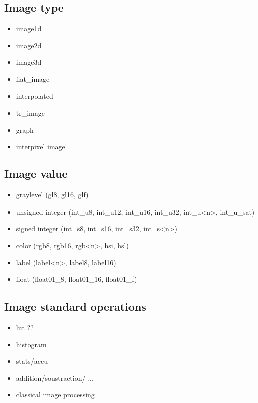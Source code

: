 \documentclass{article}
\begin{document}
\subsection{Image type}

\begin{itemize}
 \item image1d
 \item image2d
 \item image3d
 \item flat\_image
 \item interpolated
 \item tr\_image
 \item graph
 \item interpixel image
\end{itemize}

\subsection{Image value}

\begin{itemize}
 \item graylevel (gl8, gl16, glf)
 \item unsigned integer (int\_u8, int\_u12, int\_u16, int\_u32, int\_u<n>, int\_u\_sat)
 \item signed integer (int\_s8, int\_s16, int\_s32, int\_s<n>)
 \item color (rgb8, rgb16, rgb<n>, hsi, hsl)
 \item label (label<n>, label8, label16)
 \item float (float01\_8, float01\_16, float01\_f)
\end{itemize}



\subsection{Image standard operations}

\begin{itemize}
 \item lut ??
 \item histogram
 \item stats/accu
 \item addition/soustraction/ ...
 \item classical image processing
\end{itemize}
\end{document}
